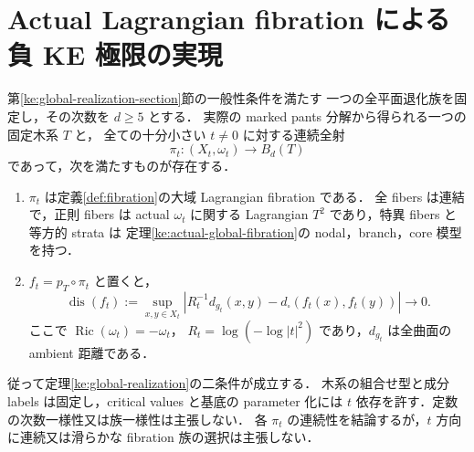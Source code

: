 \section{Actual Lagrangian fibration による負 KE 極限の実現}
\label{ke:global-metric-realization-section}

\begin{theorem}[全固定次数における大域的な計量実現]
\label{ke:global-metric-realization}
第\ref{ke:global-realization-section}節の一般性条件を満たす
一つの全平面退化族を固定し，その次数を $d\ge5$ とする．
実際の marked pants 分解から得られる一つの固定木系 $T$ と，
全ての十分小さい $t\ne0$ に対する連続全射
\[
 \pi_t:(X_t,\omega_t)\longrightarrow B_d(T)
\]
であって，次を満たすものが存在する．
\begin{enumerate}
\item $\pi_t$ は定義\ref{def:fibration}の大域 Lagrangian fibration である．
全 fibers は連結で，正則 fibers は actual $\omega_t$ に関する
Lagrangian $T^2$ であり，特異 fibers と等方的 strata は
定理\ref{ke:actual-global-fibration}の nodal，branch，core 模型を持つ．
\item $f_t=p_T\circ\pi_t$ と置くと，
\begin{equation}\label{ke:eq:global-metric-realization}
 \operatorname{dis}(f_t):=
 \sup_{x,y\in X_t}
 \left|R_t^{-1}d_{g_t}(x,y)
       -d_\square(f_t(x),f_t(y))\right|\longrightarrow0.
\end{equation}
ここで $\operatorname{Ric}(\omega_t)=-\omega_t$，
$R_t=\log(-\log|t|^2)$ であり，$d_{g_t}$ は全曲面の ambient 距離である．
\end{enumerate}
従って定理\ref{ke:global-realization}の二条件が成立する．
木系の組合せ型と成分 labels は固定し，critical values と基底の
parameter 化には $t$ 依存を許す．定数の次数一様性又は族一様性は主張しない．
各 $\pi_t$ の連続性を結論するが，$t$ 方向に連続又は滑らかな fibration 族の選択は主張しない．
\end{theorem}

